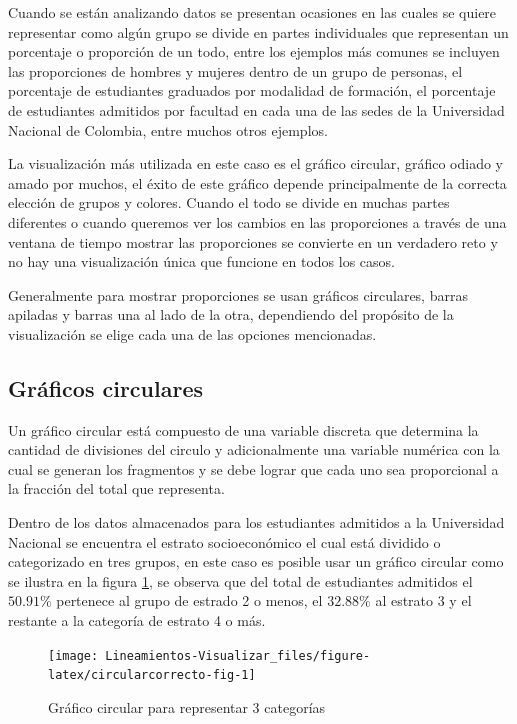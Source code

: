 \documentclass[
]{book}
\begin{document}
Cuando se están analizando datos se presentan ocasiones en las cuales se quiere representar como algún grupo se divide en partes individuales que representan un porcentaje o proporción de un todo, entre los ejemplos más comunes se incluyen las proporciones de hombres y mujeres dentro de un grupo de personas, el porcentaje de estudiantes graduados por modalidad de formación, el porcentaje de estudiantes admitidos por facultad en cada una de las sedes de la Universidad Nacional de Colombia, entre muchos otros ejemplos.

La visualización más utilizada en este caso es el gráfico circular, gráfico odiado y amado por muchos, el éxito de este gráfico depende principalmente de la correcta elección de grupos y colores. Cuando el todo se divide en muchas partes diferentes o cuando queremos ver los cambios en las proporciones a través de una ventana de tiempo mostrar las proporciones se convierte en un verdadero reto y no hay una visualización única que funcione en todos los casos.

Generalmente para mostrar proporciones se usan gráficos circulares, barras apiladas y barras una al lado de la otra, dependiendo del propósito de la visualización se elige cada una de las opciones mencionadas.

\hypertarget{gruxe1ficos-circulares}{%
\subsection{Gráficos circulares}\label{gruxe1ficos-circulares}}

Un gráfico circular está compuesto de una variable discreta que determina la cantidad de divisiones del circulo y adicionalmente una variable numérica con la cual se generan los fragmentos y se debe lograr que cada uno sea proporcional a la fracción del total que representa.

Dentro de los datos almacenados para los estudiantes admitidos a la Universidad Nacional se encuentra el estrato socioeconómico el cual está dividido o categorizado en tres grupos, en este caso es posible usar un gráfico circular como se ilustra en la figura \ref{fig:circularcorrecto-fig}, se observa que del total de estudiantes admitidos el \(50.91\%\) pertenece al grupo de estrado 2 o menos, el \(32.88\%\) al estrato 3 y el restante a la categoría de estrato 4 o más.

\begin{figure}

{\centering \texttt{[image: Lineamientos-Visualizar\_files/figure-latex/circularcorrecto-fig-1]} 

}

\caption{Gráfico circular para representar 3 categorías}\label{fig:circularcorrecto-fig}
\end{figure}
\end{document}
